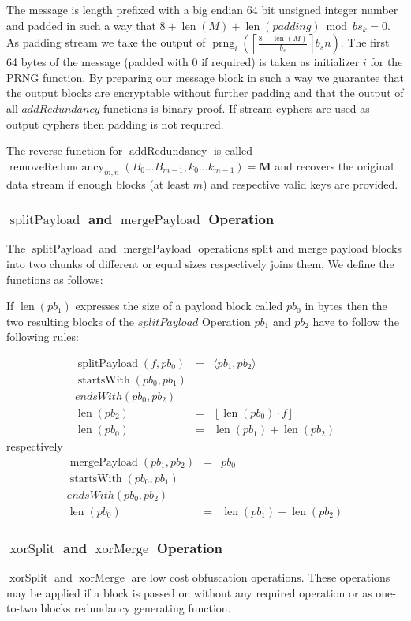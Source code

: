 \documentclass[9pt,journal,compsoc]{IEEEtran}
\DeclareMathOperator{\prng}{prng}
\DeclareMathOperator{\len}{len}
\DeclareMathOperator{\xorSplit}{xorSplit}
\DeclareMathOperator{\xorMerge}{xorMerge}
\DeclareMathOperator{\splitPayload}{splitPayload}
\DeclareMathOperator{\mergePayload}{mergePayload}
\DeclareMathOperator{\startsWith}{startsWith}
\DeclareMathOperator{\addRedundancy}{addRedundancy}
\DeclareMathOperator{\removeRedundancy}{removeRedundancy}
\begin{document}
The message is length prefixed with a big endian 64 bit unsigned integer number and padded in such a way that $8+\len(M)+\len(padding) \bmod bs_k =0$. As padding stream we take the output of $\prng_i\left(\left\lceil\frac{8+\len(M)}{b_s}\right\rceil b_s n\right )$. The first 64 bytes of the message (padded with 0 if required) is taken as initializer $i$ for the PRNG function. By preparing our message block in such a way we guarantee that the output blocks are encryptable without further padding and that the output of all $addRedundancy$ functions is binary proof. If stream cyphers are used as output cyphers then padding is not required.

The reverse function for $\addRedundancy$ is called $\removeRedundancy_{m,n}(B_0\ldots B_{m-1},k_0\ldots k_{m-1})=\mathbf{M}$ and recovers the original data stream if enough blocks (at least $m$) and respective valid keys are provided. 

\subsubsection{$\splitPayload$ and $\mergePayload$ Operation}
The $\splitPayload$ and $\mergePayload$ operations split and merge payload blocks into two chunks of different or equal sizes respectively joins them. We define the functions as follows:

If $\len(pb_1)$ expresses the size of a payload block called $pb_0$ in bytes then the two resulting blocks of the $splitPayload$ Operation $pb_1$ and $pb_2$ have to follow the following rules:

\begin{eqnarray}
\splitPayload(f, pb_0) & = &\langle pb_1, pb_2 \rangle\\
\startsWith(pb_0, pb_1)\\
endsWith(pb_0, pb_2)\\
\len(pb_2) & = & \left\lfloor \len(pb_0)\cdot f\right \rfloor\\
\len(pb_0) & = & \len(pb_1) + \len(pb_2)
\end{eqnarray}
respectively
\begin{eqnarray}
\mergePayload(pb_1, pb_2) & = & pb_0 \\
\startsWith(pb_0, pb_1)\\
endsWith(pb_0, pb_2)\\
\len(pb_0) & = & \len(pb_1) + \len(pb_2)
\end{eqnarray}
 
\subsubsection{$\xorSplit$ and $\xorMerge$ Operation}
$\xorSplit$ and $\xorMerge$ are low cost obfuscation operations. These operations may be applied if a block is passed on without any required operation or as one-to-two blocks redundancy generating function. 
\end{document}
